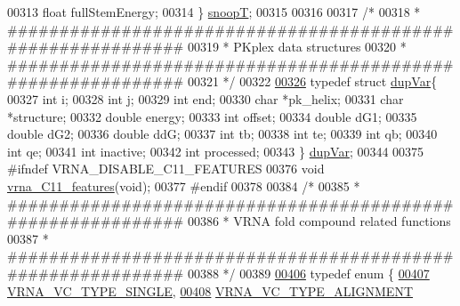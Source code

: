 \begin{DoxyCode}
00313   \textcolor{keywordtype}{float} fullStemEnergy;
00314 \} \hyperlink{group__data__structures_structsnoopT}{snoopT};
00315 
00316 
00317 \textcolor{comment}{/*}
00318 \textcolor{comment}{* ############################################################}
00319 \textcolor{comment}{* PKplex data structures}
00320 \textcolor{comment}{* ############################################################}
00321 \textcolor{comment}{*/}
00322 
\hypertarget{data__structures_8h_source.tex_l00326}{}\hyperlink{group__data__structures}{00326} \textcolor{keyword}{typedef} \textcolor{keyword}{struct }\hyperlink{group__data__structures_structdupVar}{dupVar}\{
00327   \textcolor{keywordtype}{int} i;
00328   \textcolor{keywordtype}{int} j;
00329   \textcolor{keywordtype}{int} end;
00330   \textcolor{keywordtype}{char} *pk\_helix;
00331   \textcolor{keywordtype}{char} *structure;
00332   \textcolor{keywordtype}{double} energy;
00333   \textcolor{keywordtype}{int} offset;
00334   \textcolor{keywordtype}{double} dG1;
00335   \textcolor{keywordtype}{double} dG2;
00336   \textcolor{keywordtype}{double} ddG;
00337   \textcolor{keywordtype}{int} tb;
00338   \textcolor{keywordtype}{int} te;
00339   \textcolor{keywordtype}{int} qb;
00340   \textcolor{keywordtype}{int} qe;
00341   \textcolor{keywordtype}{int} inactive;
00342   \textcolor{keywordtype}{int} processed;
00343 \} \hyperlink{group__data__structures_gabd3b93f9aaa9f3acce2d148bae97d24e}{dupVar};
00344 
00375 \textcolor{preprocessor}{#ifndef VRNA\_DISABLE\_C11\_FEATURES}
00376 \textcolor{keywordtype}{void} \hyperlink{group__data__structures_ga21744ae2d6a17309f9327d3547cef0cb}{vrna\_C11\_features}(\textcolor{keywordtype}{void});
00377 \textcolor{preprocessor}{#endif}
00378 
00384 \textcolor{comment}{/*}
00385 \textcolor{comment}{* ############################################################}
00386 \textcolor{comment}{* VRNA fold compound related functions}
00387 \textcolor{comment}{* ############################################################}
00388 \textcolor{comment}{*/}
00389 
\hypertarget{data__structures_8h_source.tex_l00406}{}\hyperlink{group__fold__compound_ga01a4ff86fa71deaaa5d1abbd95a1447d}{00406} \textcolor{keyword}{typedef} \textcolor{keyword}{enum} \{
\hypertarget{data__structures_8h_source.tex_l00407}{}\hyperlink{group__fold__compound_gga01a4ff86fa71deaaa5d1abbd95a1447da1608d3aa78905fc39e0d25a624ac9512}{00407}   \hyperlink{group__fold__compound_gga01a4ff86fa71deaaa5d1abbd95a1447da1608d3aa78905fc39e0d25a624ac9512}{VRNA\_VC\_TYPE\_SINGLE},    
\hypertarget{data__structures_8h_source.tex_l00408}{}\hyperlink{group__fold__compound_gga01a4ff86fa71deaaa5d1abbd95a1447da056345f1bcfe7cd595d1fd437c05246d}{00408}   \hyperlink{group__fold__compound_gga01a4ff86fa71deaaa5d1abbd95a1447da056345f1bcfe7cd595d1fd437c05246d}{VRNA\_VC\_TYPE\_ALIGNMENT}  

\end{DoxyCode}
